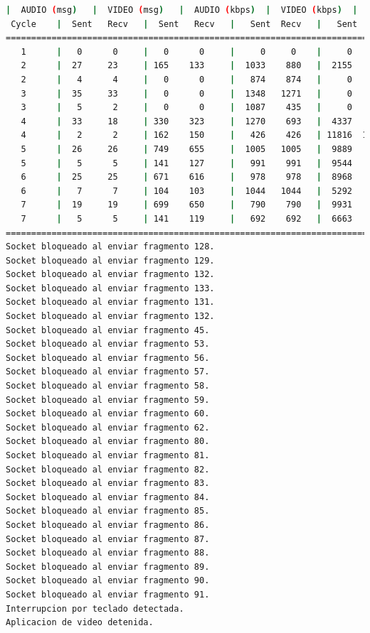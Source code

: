 \begin{lstlisting}[language=bash,basicstyle=\ttfamily\scriptsize]
          |  AUDIO (msg)   |  VIDEO (msg)   |  AUDIO (kbps)  |  VIDEO (kbps)  |   CPU (%)
 Cycle    |  Sent   Recv   |  Sent   Recv   |   Sent  Recv   |   Sent  Recv   | Program System
============================================================================================
   1      |   0      0     |   0      0     |     0     0    |     0     0    |   0      0
   2      |  27     23     | 165    133     |  1033    880   |  2155   1739   |  25     62
   2      |   4      4     |   0      0     |   874    874   |     0      0   |  20     64
   3      |  35     33     |   0      0     |  1348   1271   |     0      0   |  37     72
   3      |   5      2     |   0      0     |  1087    435   |     0      0   |  46     72
   4      |  33     18     | 330    323     |  1270    693   |  4337   4245   |  29     76
   4      |   2      2     | 162    150     |   426    426   | 11816  10927   |  65     78
   5      |  26     26     | 749    655     |  1005   1005   |  9889   8649   |  31     73
   5      |   5      5     | 141    127     |   991    991   |  9544   8595   |  24     71
   6      |  25     25     | 671    616     |   978    978   |  8968   8232   |  26     76
   6      |   7      7     | 104    103     |  1044   1044   |  5292   5251   |  31     76
   7      |  19     19     | 699    650     |   790    790   |  9931   9236   |  33     75
   7      |   5      5     | 141    119     |   692    692   |  6663   5622   |  16     74
============================================================================================
Socket bloqueado al enviar fragmento 128.
Socket bloqueado al enviar fragmento 129.
Socket bloqueado al enviar fragmento 132.
Socket bloqueado al enviar fragmento 133.
Socket bloqueado al enviar fragmento 131.
Socket bloqueado al enviar fragmento 132.
Socket bloqueado al enviar fragmento 45.
Socket bloqueado al enviar fragmento 53.
Socket bloqueado al enviar fragmento 56.
Socket bloqueado al enviar fragmento 57.
Socket bloqueado al enviar fragmento 58.
Socket bloqueado al enviar fragmento 59.
Socket bloqueado al enviar fragmento 60.
Socket bloqueado al enviar fragmento 62.
Socket bloqueado al enviar fragmento 80.
Socket bloqueado al enviar fragmento 81.
Socket bloqueado al enviar fragmento 82.
Socket bloqueado al enviar fragmento 83.
Socket bloqueado al enviar fragmento 84.
Socket bloqueado al enviar fragmento 85.
Socket bloqueado al enviar fragmento 86.
Socket bloqueado al enviar fragmento 87.
Socket bloqueado al enviar fragmento 88.
Socket bloqueado al enviar fragmento 89.
Socket bloqueado al enviar fragmento 90.
Socket bloqueado al enviar fragmento 91.
Interrupcion por teclado detectada.
Aplicacion de video detenida.


\end{lstlisting}

